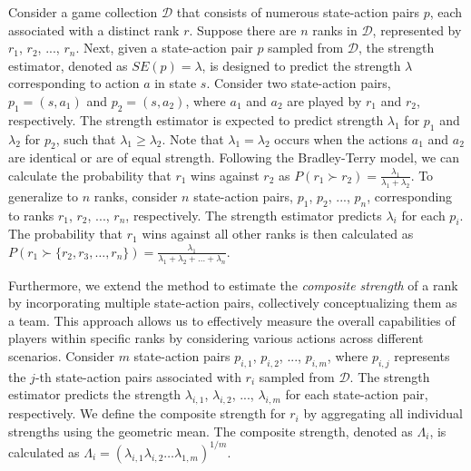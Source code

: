 Consider a game collection $\mathcal{D}$ that consists of numerous state-action pairs $p$, each associated with a distinct rank $r$.
Suppose there are $n$ ranks in $\mathcal{D}$, represented by $r_1$, $r_2$, ..., $r_n$.
Next, given a state-action pair $p$ sampled from $\mathcal{D}$, the strength estimator, denoted as $SE(p)=\lambda$, is designed to predict the strength $\lambda$ corresponding to action $a$ in state $s$.
Consider two state-action pairs, $p_1=(s,a_1)$ and $p_2=(s,a_2)$, where $a_1$ and $a_2$ are played by $r_1$ and $r_2$, respectively.
The strength estimator is expected to predict strength $\lambda_1$ for $p_1$ and $\lambda_2$ for $p_2$, such that $\lambda_1\geq\lambda_2$.
Note that $\lambda_1=\lambda_2$ occurs when the actions $a_1$ and $a_2$ are identical or are of equal strength.
Following the Bradley-Terry model, we can calculate the probability that $r_1$ wins against $r_2$ as $P(r_1\succ r_2)=\frac{\lambda_1}{\lambda_1+\lambda_2}$.
To generalize to $n$ ranks, consider $n$ state-action pairs, $p_1$, $p_2$, ..., $p_n$, corresponding to ranks $r_1$, $r_2$, ..., $r_n$, respectively.
The strength estimator predicts $\lambda_i$ for each $p_i$.
The probability that $r_1$ wins against all other ranks is then calculated as $P(r_1\succ\{r_2, r_3, \ldots, r_n\})=\frac{\lambda_1}{\lambda_1+\lambda_2+\ldots+\lambda_n}$.

Furthermore, we extend the method to estimate the \textit{composite strength} of a rank by incorporating multiple state-action pairs, collectively conceptualizing them as a team. 
This approach allows us to effectively measure the overall capabilities of players within specific ranks by considering various actions across different scenarios.
Consider $m$ state-action pairs $p_{i,1}$, $p_{i,2}$, ..., $p_{i,m}$, where $p_{i,j}$ represents the $j$-th state-action pairs associated with $r_i$ sampled from $\mathcal{D}$.
The strength estimator predicts the strength $\lambda_{i,1}$, $\lambda_{i,2}$, ..., $\lambda_{i,m}$ for each state-action pair, respectively.
We define the composite strength for $r_i$ by aggregating all individual strengths using the geometric mean.
The composite strength, denoted as $\Lambda_i$, is calculated as $\Lambda_i =(\lambda_{i,1}\lambda_{i,2}\ldots\lambda_{1,m})^{1/m}$.

